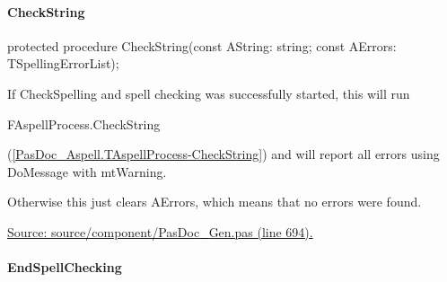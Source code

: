 \documentclass{report}
\newif\ifpdf
\begin{document}
\paragraph*{CheckString}\hspace*{\fill}

\label{PasDoc_Gen.TDocGenerator-CheckString}
\begin{list}{}{
\setlength{\itemindent}{0cm}
\setlength{\listparindent}{0cm}
\setlength{\leftmargin}{\evensidemargin}
\addtolength{\leftmargin}{\tmplength}
\settowidth{\labelsep}{X}
\addtolength{\leftmargin}{\labelsep}
\setlength{\labelwidth}{\tmplength}
}
\item[\textbf{Declaration}\hfill]
\ifpdf
\begin{flushleft}
\fi
\begin{ttfamily}
protected procedure CheckString(const AString: string; const AErrors: TSpellingErrorList);\end{ttfamily}

\ifpdf
\end{flushleft}
\fi

\par
\item[\textbf{Description}]
If CheckSpelling and spell checking was successfully started, this will run \begin{ttfamily}FAspellProcess.CheckString\end{ttfamily}(\ref{PasDoc_Aspell.TAspellProcess-CheckString}) and will report all errors using DoMessage with mtWarning.

Otherwise this just clears AErrors, which means that no errors were found.\par
\href{https://github.com/pasdoc/pasdoc/blob/master/source/component/PasDoc_Gen.pas#L694}{Source: source/component/PasDoc{\_}Gen.pas (line 694).}

\end{list}
\paragraph*{EndSpellChecking}\hspace*{\fill}
\end{document}
